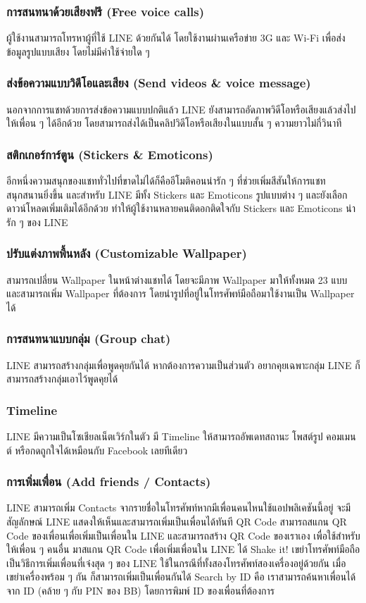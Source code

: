 \subsubsection{การสนทนาด้วยเสียงฟรี (Free voice calls)} 
\quad ผู้ใช้งานสามารถโทรหาผู้ที่ใช้ LINE ด้วยกันได้ โดยใช้งานผ่านเครือข่าย 3G และ Wi-Fi เพื่อส่งข้อมูลรูปแบบเสียง โดยไม่มีค่าใช้จ่ายใด ๆ  
\subsubsection{ส่งข้อความแบบวิดีโอและเสียง (Send videos \& voice message)} 
\quad นอกจากการแชทด้วยการส่งข้อความแบบปกติแล้ว LINE ยังสามารถอัดภาพวิดีโอหรือเสียงแล้วส่งไปให้เพื่อน ๆ ได้อีกด้วย โดยสามารถส่งได้เป็นคลิปวิดีโอหรือเสียงในแบบสั้น ๆ ความยาวไม่กี่วินาที   
\subsubsection{สติกเกอร์การ์ตูน (Stickers \& Emoticons)}
\quad อีกหนึ่งความสนุกของแชททั่วไปที่ขาดไม่ได้ก็คืออีโมติคอนน่ารัก ๆ ที่ช่วยเพิ่มสีสันให้การแชทสนุกสนานยิ่งขึ้น และสำหรับ LINE มีทั้ง Stickers และ Emoticons รูปแบบต่าง ๆ และยังเลือกดาวน์โหลดเพิ่มเติมได้อีกด้วย ทำให้ผู้ใช้งานหลายคนติดอกติดใจกับ Stickers และ Emoticons น่ารัก ๆ ของ LINE  
\subsubsection{ปรับแต่งภาพพื้นหลัง (Customizable Wallpaper)}
\quad สามารถเปลี่ยน Wallpaper ในหน้าต่างแชทได้ โดยจะมีภาพ Wallpaper มาให้ทั้งหมด 23 แบบ และสามารถเพิ่ม Wallpaper ที่ต้องการ โดยนำรูปที่อยู่ในโทรศัพท์มือถือมาใช้งานเป็น Wallpaper ได้  
\subsubsection{การสนทนาแบบกลุ่ม (Group chat)} 
\quad LINE สามารถสร้างกลุ่มเพื่อพูดคุยกันได้ หากต้องการความเป็นส่วนตัว อยากคุยเฉพาะกลุ่ม LINE ก็สามารถสร้างกลุ่มเอาไว้พูดคุยได้ 
\subsubsection{Timeline} 
\quad LINE มีความเป็นโซเชียลเน็ตเวิร์กในตัว มี Timeline ให้สามารถอัพเดทสถานะ โพสต์รูป คอมเมนต์ หรือกดถูกใจได้เหมือนกับ Facebook เลยทีเดียว 
\subsubsection{การเพิ่มเพื่อน (Add friends / Contacts)}
\quad LINE สามารถเพิ่ม Contacts จากรายชื่อในโทรศัพท์หากมีเพื่อนคนไหนใช้แอปพลิเคชันนี้อยู่ จะมีสัญลักษณ์ LINE แสดงให้เห็นและสามารถเพิ่มเป็นเพื่อนได้ทันที QR Code สามารถสแกน QR Code ของเพื่อนเพื่อเพิ่มเป็นเพื่อนใน LINE และสามารถสร้าง QR Code ของเราเอง เพื่อใช้สำหรับให้เพื่อน ๆ คนอื่น มาสแกน QR Code เพื่อเพิ่มเพื่อนใน LINE ได้ Shake it! เขย่าโทรศัพท์มือถือ เป็นวิธีการเพิ่มเพื่อนที่เจ๋งสุด ๆ ของ LINE ใช้ในกรณีที่ทั้งสองโทรศัพท์สองเครื่องอยู่ด้วยกัน เมื่อเขย่าเครื่องพร้อม ๆ กัน ก็สามารถเพิ่มเป็นเพื่อนกันได้ Search by ID คือ เราสามารถค้นหาเพื่อนได้จาก ID (คล้าย ๆ กับ PIN ของ BB) โดยการพิมพ์ ID ของเพื่อนที่ต้องการ 


